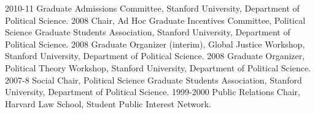 \documentclass[letterpaper]{moderncv}
\begin{document}
\cvitem
{2010-11}
{Graduate Admissions Committee, Stanford University, Department of Political Science.}
\vspace{1mm}
\cvitem
{2008}
{Chair, Ad Hoc Graduate Incentives Committee, Political Science Graduate Students Association, Stanford University, Department of Political Science.}
\vspace{1mm}
\cvitem
{2008}
{Graduate Organizer (interim), Global Justice Workshop, Stanford University, Department of Political Science.}
\vspace{1mm}
\cvitem
{2008}
{Graduate Organizer, Political Theory Workshop, Stanford University, Department of Political Science.}
\vspace{1mm}
\cvitem
{2007-8}
{Social Chair, Political Science Graduate Students Association, Stanford University, Department of Political Science.}
\vspace{1mm}
\cvitem
{1999-2000}
{Public Relations Chair, Harvard Law School, Student Public Interest Network.}
\vspace{1mm}
\end{document}
